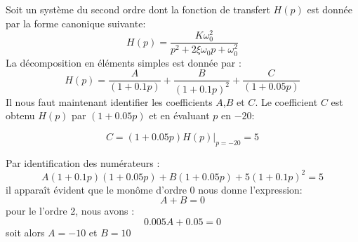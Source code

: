 Soit un système du second ordre dont la fonction de transfert $H(p)$ est donnée
par la forme canonique suivante:
\[
H(p)=\dfrac{K\omega_0^2}{p^2+2\xi\omega_0p+\omega_0^2}
\]
La décomposition en éléments simples est donnée par :
\[
H(p)=\dfrac{A}{(1+0.1p)}+\dfrac{B}{(1+0.1p)^2}+\dfrac{C}{(1+0.05p)}
\]
Il nous faut maintenant identifier les coefficients $A$,$B$ et $C$.
Le coefficient $C$ est obtenu $H(p)$ par $(1+0.05p)$ et en évaluant $p$ en 
$-20$:

\[
C=(1+0.05p)H(p)\Big|_{p=-20}=5
\]

Par identification des numérateurs :
\[
A(1+0.1p)(1+0.05p)+B(1+0.05p)+5(1+0.1p)^2=5
\]
il apparaît évident que le monôme d'ordre 0 nous donne l'expression:
\[
A+B=0
\]
pour le l'ordre 2, nous avons :
\[
0.005A+0.05=0
\]
soit alors $A=-10$ et $B=10$

